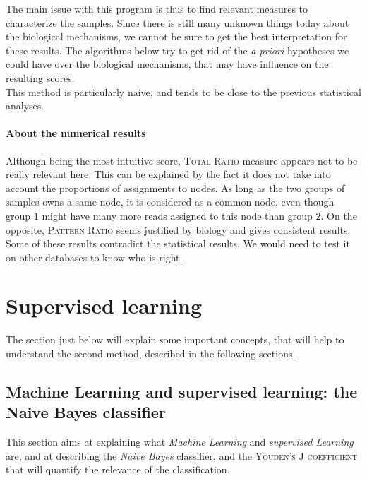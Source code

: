 \documentclass{report}
\begin{document}
The main issue with this program is thus to find relevant measures to characterize the samples. Since there is still many unknown things today about the biological mechanisms, we cannot be sure to get the best interpretation for these results. The algorithms below try to get rid of the \emph{a priori} hypotheses we could have over the biological mechanisms, that may have influence on the resulting scores.\\

This method is particularly naive, and tends to be close to the previous statistical analyses.\\

\subsubsection{About the numerical results}

Although being the most intuitive score, \textsc{Total Ratio} measure appears not to be really relevant here. This can be explained by the fact it does not take into account the proportions of assignments to nodes. As long as the two groups of samples owns a same node, it is considered as a common node, even though group $1$ might have many more reads assigned to this node than group $2$. On the opposite, \textsc{Pattern Ratio} seems justified by biology and gives consistent results.\\

Some of these results contradict the statistical results. We would need to test it on other databases to know who is right.\\

\chapter{Supervised learning}

The section just below will explain some important concepts, that will help to understand the second method, described in the following sections. 

\section{Machine Learning and supervised learning: the Naive Bayes classifier}

This section aims at explaining what \emph{Machine Learning} and \emph{supervised Learning} are, and at describing the \emph{Naive Bayes} classifier, and the \textsc{Youden's J coefficient} that will quantify the relevance of the classification.
\end{document}
